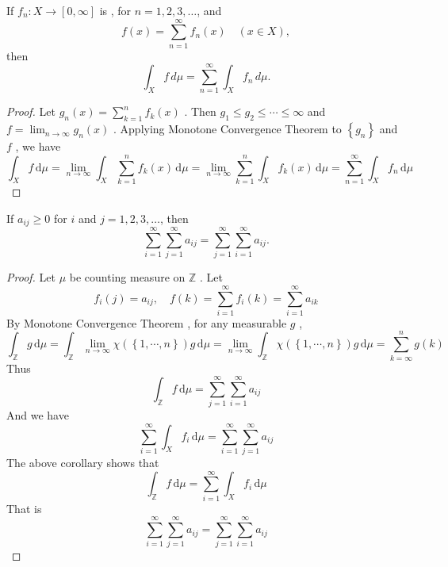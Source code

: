 \documentclass[../main.tex]{subfiles}
\begin{document}
\begin{corollary}{}{}
    If $f_n: X \to [0, \infty]$ is , for $n = 1, 2, 3, \dots$, and
\[
f(x) = \sum_{n=1}^{\infty} f_n(x) \quad (x \in X),
\]
then
\[
\int_X f \, d\mu = \sum_{n=1}^{\infty} \int_X f_n \, d\mu.
\]
\end{corollary}

\begin{proof}
    Let \(  g_{n}\left( x \right)= \sum _{k= 1}^{n}f_{k}\left( x \right)    \) .  Then \(  g_1\le g_2\le \cdots \le \infty  \) and  \(  f= \lim_{n\to \infty}g_{n}\left( x \right)   \)  . Applying Monotone Convergence Theorem to \(  \left\{ g_{n} \right\}   \) and \(  f  \) , we have  \[
    \int_{X}f\,\mathrm{d} \mu = \lim_{n\to \infty} \int_{X} \sum _{k = 1}^{n}f_{k}\left( x \right)\,\mathrm{d} \mu  =  \lim_{n\to \infty}\sum _{k= 1}^{n}\int_{X}f_{k}\left( x \right)\,\mathrm{d} \mu =  \sum _{n = 1}^{\infty} \int_{X}f_{n}\,\mathrm{d} \mu   
    \]
\end{proof}


\begin{corollary}{}{}
If $a_{ij} \ge 0$ for $i$ and $j = 1, 2, 3, \dots$, then
\[ \sum_{i=1}^{\infty} \sum_{j=1}^{\infty} a_{ij} = \sum_{j=1}^{\infty} \sum_{i=1}^{\infty} a_{ij}. \]
\end{corollary}
\begin{proof}
    Let \(  \mu   \) be counting measure on \(  \mathbb{Z}   \) .     Let \[
    f_{i}\left( j \right) = a_{ij}   ,\quad f\left( k \right)= \sum _{ i= 1}^{\infty}f_{i}\left( k \right)   =  \sum _{i = 1}^{\infty}a_{ik}
    \] By Monotone Convergence Theorem , for any measurable \(  g  \) ,   \[
    \int_{\mathbb{Z} }g\,\mathrm{d} \mu  =  \int_{\mathbb{Z} } \lim_{n\to \infty}  \chi  \left( \left\{ 1,\cdots ,n \right\} \right)g \,\mathrm{d} \mu =  \lim_{n\to \infty} \int_{\mathbb{Z} } \chi  \left( \left\{ 1,\cdots ,n \right\} \right)g\,\mathrm{d} \mu =   \sum _{ k= \infty}^{n}g\left( k \right)  
    \] Thus \[
    \int_{\mathbb{Z} } f\,\mathrm{d} \mu =  \sum _{ j= 1}^{\infty}\sum _{i= 1}^{\infty}a_{ij}
    \]   And we have  \[
    \sum _{ i= 1}^{\infty} \int_{X}f_{i}\,\mathrm{d} \mu =  \sum _{i = 1}^{\infty}  \sum _{j= 1}^{\infty}a_{ij}
    \] The above  corollary shows that \[
    \int_{\mathbb{Z} }f\,\mathrm{d} \mu =  \sum _{ i= 1}^{\infty}\int_{X}f_{i}\,\mathrm{d} \mu  
    \] That is \[
    \sum _{i= 1}^{\infty}\sum _{j= 1}^{\infty}a_{ij}= \sum _{j= 1}^{\infty}\sum _{i= 1}^{\infty}a_{ij}
    \]
\end{proof}
\end{document}
